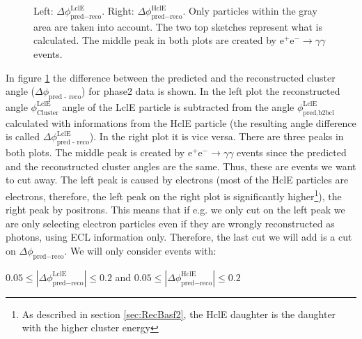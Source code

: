 \documentclass[a4paper,11pt,twosided,final,german,openbib,pdftex,listof=totoc,bibliography=totoc]{scrbook}
\begin{document}
\begin{figure}[h!]
\begin{minipage}[b]{\textwidth}
	\caption[b2bClusterPhi - clusterPhi For Phase2 Data]{Left: $\Delta \phi _{\textrm{pred} - \textrm{reco}}^{\textrm{LclE}}$. Right:  $\Delta \phi _{\textrm{pred} - \textrm{reco}}^{\textrm{HclE}}$. Only particles within the gray area are taken into account. The two top sketches represent what is calculated. The middle peak in both plots are created by $\textrm{e}^+\textrm{e}^- \rightarrow \gamma \gamma$ events.}
	\label{fig:b2bData}

\end{minipage}
\end{figure}


In figure \ref{fig:b2bData} the difference between the predicted and the reconstructed cluster angle ($\Delta \phi_{\textrm{pred - reco}}$) for phase2 data is shown. In the left plot the reconstructed angle $\phi_{\textrm{Cluster}}^{\textrm{LclE}}$ angle of the LclE particle is subtracted from the angle  $\phi_{\textrm{pred,b2bcl}}^{\textrm{LclE}}$ calculated with informations from the HclE particle (the resulting angle difference is called $\Delta \phi_{\textrm{pred - reco}}^{\textrm{LclE}}$). In the right plot it is vice versa. There are three peaks in both plots. The middle peak is created by $\textrm{e}^+ \textrm{e}^- \rightarrow \gamma \gamma$ events since the predicted and the reconstructed cluster angles are the same. Thus, these are events we want to cut away. The left peak is caused by electrons (most of the HclE particles are electrons, therefore, the left peak on the right plot is significantly higher\footnote{As described in section \ref{sec:RecBasf2}, the HclE daughter is the daughter with the higher cluster energy}), the right peak by positrons. This means that if e.g. we only cut on the left peak we are only selecting electron particles even if they are wrongly reconstructed as photons, using ECL information only. 
Therefore, the last cut we will add is a cut on $\Delta \phi _{\textrm{pred} - \textrm{reco}}$. We will only consider events with:
\newline













 $0.05 \leq |\Delta \phi _{\textrm{pred} - \textrm{reco}}^{\textrm{LclE}}| \leq 0.2 $ and  $0.05 \leq |\Delta \phi _{\textrm{pred} - \textrm{reco}}^{\textrm{HclE}}| \leq 0.2$
\newline
\end{document}

